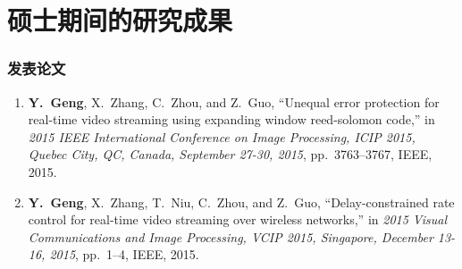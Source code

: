 %
%
%
%


%
%
\chapter*{硕士期间的研究成果}
{}
\renewcommand\labelenumi{[\theenumi]}

\subsection*{发表论文}
\newitemsep
{\typebib
\begin{enumerate}
  \item \textbf{Y.~Geng}, X.~Zhang, C.~Zhou, and Z.~Guo, ``Unequal error protection for real-time video streaming using expanding window reed-solomon code,'' in {\em 2015 {IEEE} International Conference on Image Processing, {ICIP} 2015, Quebec City, QC, Canada, September 27-30, 2015}, pp.~3763--3767, {IEEE}, 2015.
  \item \textbf{Y.~Geng}, X.~Zhang, T.~Niu, C.~Zhou, and Z.~Guo, ``Delay-constrained rate control for real-time video streaming over wireless networks,'' in {\em 2015 Visual Communications and Image Processing, {VCIP} 2015, Singapore, December 13-16, 2015}, pp.~1--4, {IEEE}, 2015.
\end{enumerate}
}

